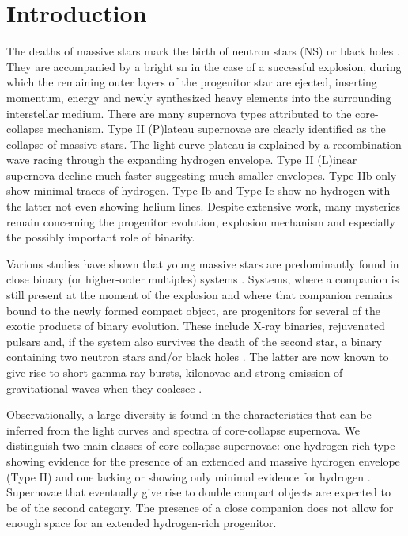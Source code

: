 \documentclass{aa}
\begin{document}
\section{Introduction}

The deaths of massive stars mark the birth of neutron stars (NS) or black holes \citep[BH; e.g.][]{2002RvMP...74.1015W}.  They are accompanied by a bright \gls{sn} in the case of a successful explosion, during which the remaining outer layers of the progenitor star are ejected, inserting momentum, energy and newly synthesized heavy elements into the surrounding interstellar medium. There are many supernova types attributed to the core-collapse mechanism. Type II (P)lateau supernovae are clearly identified as the collapse of massive stars. The light curve plateau is explained by a recombination wave racing through the expanding hydrogen envelope. Type II (L)inear supernova decline much faster suggesting much smaller envelopes. Type IIb only show minimal traces of hydrogen. Type Ib and Type Ic show no hydrogen with the latter not even showing helium lines. Despite extensive work, many mysteries remain concerning the progenitor evolution, explosion mechanism and especially the possibly important role of binarity.

Various studies have shown that young massive stars are predominantly found in close binary (or higher-order multiples) systems \citep[e.g.][]{2007ApJ...670..747K, 2012MNRAS.424.1925C, 2012Sci...337..444S, 2014ApJS..213...34K, 2017A&A...598A..84A}.
Systems, where a companion is still present at the moment of the explosion and where that companion remains bound to the newly formed compact object, are progenitors for several of the exotic products of binary evolution. These include X-ray binaries, rejuvenated pulsars and, if the system also survives the death of the second star, a binary containing two neutron stars and/or black holes  \citep[e.g.][]{2006csxs.book..623T}. The latter are now known to give rise to short-gamma ray bursts, kilonovae and strong emission of gravitational waves when they coalesce \citep{2017PhRvL.119p1101A}.

Observationally, a large diversity is found in the characteristics that can be inferred from the light curves and spectra of core-collapse supernova.  We distinguish two main classes of core-collapse supernovae: one hydrogen-rich type showing evidence for the presence of an extended and massive hydrogen envelope (Type II) and one lacking or showing only minimal evidence for hydrogen  \citep[Type Ib/c and Type IIb respectively; see e.g.][for definitions]{1997ARA&A..35..309F}.  Supernovae that eventually give rise to double compact objects are expected to be of the second category. The presence of a close companion does not allow for enough space for an extended hydrogen-rich progenitor.
\end{document}
